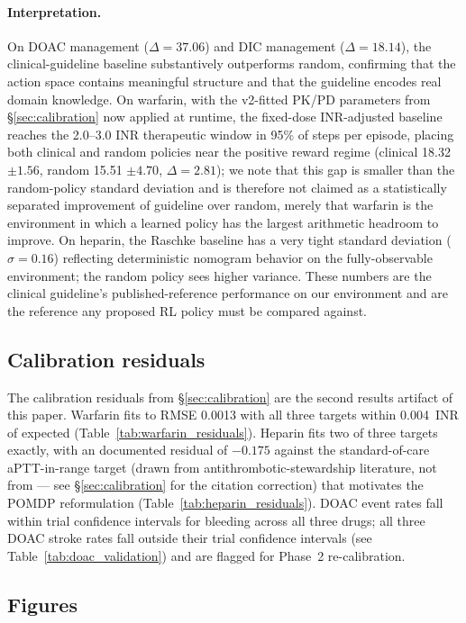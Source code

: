 \documentclass[11pt]{article}
\begin{document}
\paragraph{Interpretation.} On DOAC management ($\Delta = 37.06$) and DIC management ($\Delta = 18.14$), the clinical-guideline baseline substantively outperforms random, confirming that the action space contains meaningful structure and that the guideline encodes real domain knowledge. On warfarin, with the v2-fitted PK/PD parameters from §\ref{sec:calibration} now applied at runtime, the fixed-dose INR-adjusted baseline reaches the 2.0--3.0 INR therapeutic window in 95\% of steps per episode, placing both clinical and random policies near the positive reward regime (clinical 18.32 $\pm 1.56$, random 15.51 $\pm 4.70$, $\Delta = 2.81$); we note that this gap is smaller than the random-policy standard deviation and is therefore not claimed as a statistically separated improvement of guideline over random, merely that warfarin is the environment in which a learned policy has the largest arithmetic headroom to improve. On heparin, the Raschke baseline has a very tight standard deviation ($\sigma = 0.16$) reflecting deterministic nomogram behavior on the fully-observable environment; the random policy sees higher variance. These numbers are the clinical guideline's published-reference performance on our environment and are the reference any proposed RL policy must be compared against.

\subsection{Calibration residuals}

The calibration residuals from \S\ref{sec:calibration} are the second results artifact of this paper. Warfarin fits to RMSE 0.0013 with all three targets within 0.004~INR of expected (Table~\ref{tab:warfarin_residuals}). Heparin fits two of three targets exactly, with an documented residual of $-0.175$ against the standard-of-care aPTT-in-range target (drawn from antithrombotic-stewardship literature, not from \citet{nemati2016} --- see \S\ref{sec:calibration} for the citation correction) that motivates the POMDP reformulation (Table~\ref{tab:heparin_residuals}). DOAC event rates fall within trial confidence intervals for bleeding across all three drugs; all three DOAC stroke rates fall outside their trial confidence intervals (see Table~\ref{tab:doac_validation}) and are flagged for Phase~2 re-calibration.

\subsection{Figures}
\end{document}
